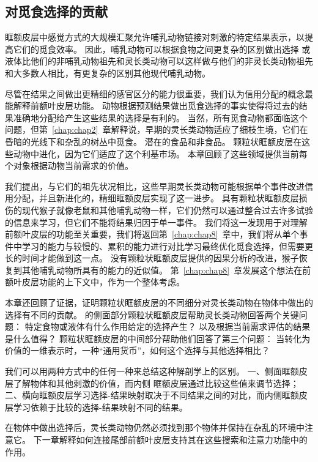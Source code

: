 \subsection{对觅食选择的贡献}

眶额皮层中感觉方式的大规模汇聚允许哺乳动物链接对刺激的特定结果表示，以提高它们的觅食效率。
因此，哺乳动物可以根据食物之间更复杂的区别做出选择
或液体比他们的非哺乳动物祖先和灵长类动物可以这样做与他们的非灵长类动物祖先和大多数人相比，有更复杂的区别其他现代哺乳动物。\par


尽管在结果之间做出更精细的感官区分的能力很重要，我们认为信用分配的概念最能解释前额叶皮层功能。
动物根据预测结果做出觅食选择的事实使得将过去的结果准确地分配给产生这些结果的选择是有利的。
当然，所有觅食动物都面临这个问题，但第~\ref{chap:chap2}~章解释说，早期的灵长类动物适应了细枝生境，它们在昏暗的光线下和杂乱的树丛中觅食。
潜在的食品和非食品。
颗粒状眶额皮层在这些动物中进化，因为它们适应了这个利基市场。
本章回顾了这些领域提供当前每个对象根据动物当前需求的价值。\par


我们提出，与它们的祖先状况相比，这些早期灵长类动物可能根据单个事件改进信用分配，并且新进化的，精细眶额皮层实现了这一进步。
具有颗粒状眶额皮层损伤的现代猴子就像老鼠和其他哺乳动物一样，它们仍然可以通过整合过去许多试验的信息来学习，但它们不能将结果归因于单一事件。
我们将这一发现用于对理解前额叶皮层的功能至关重要，我们将返回第~\ref{chap:chap8}~章中，我们将从单个事件中学习的能力与较慢的、累积的能力进行对比学习最终优化觅食选择，但需要更长的时间才能做到这一点。
没有颗粒状眶额皮层提供的因果分析的改进，猴子恢复到其他哺乳动物所具有的能力的近似值。
第~\ref{chap:chap8}~章发展这个想法在前额叶皮层功能的上下文中，作为一个整体考虑。\par


本章还回顾了证据，证明颗粒状眶额皮层的不同细分对灵长类动物在物体中做出的选择有不同的贡献。
的侧面部分颗粒状眶额皮层帮助灵长类动物回答两个关键问题：
特定食物或液体有什么作用给定的选择产生？
以及根据当前需求评估的结果是什么值得？
颗粒状眶额皮层的中间部分帮助他们回答了第三个问题：
当转化为价值的一维表示时，一种“通用货币”，如何这个选择与其他选择相比？\par


我们可以用两种方式中的任何一种来总结这种解剖学上的区别。
一、侧面眶额皮层了解物体和其他刺激的价值，而内侧 眶额皮层通过比较这些值来调节选择\cite{noonan2010separate}； 
二、横向眶额皮层学习选择-结果映射取决于不同结果之间的对比，而内侧眶额皮层学习依赖于比较的选择-结果映射不同的结果\cite{rudebeck2011dissociable}。\par


在物体中做出选择后，灵长类动物仍然必须找到那个物体并保持在杂乱的环境中注意它。
下一章解释如何连接尾部前额叶皮层支持其在这些搜索和注意力功能中的作用。\par



